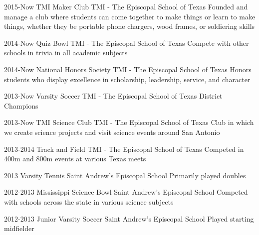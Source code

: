 \documentclass[]{friggeri-cv} %
\begin{document}
\begin{entrylist}


\entry
{2015-Now}
{TMI Maker Club}
{TMI - The Episcopal School of Texas}
{Founded and manage a club where students can come together to make things or learn to make things, whether they be portable phone chargers, wood frames, or soldiering skills}


\entry
{2014-Now}
{Quiz Bowl}
{TMI - The Episcopal School of Texas}
{Compete with other schools in trivia in all academic subjects}


\entry
{2014-Now}
{National Honors Society}
{TMI - The Episcopal School of Texas}
{Honors students who display excellence in scholarship, leadership, service, and character}


\entry
{2013-Now}
{Varsity Soccer}
{TMI - The Episcopal School of Texas}
{District Champions}


\entry
{2013-Now}
{TMI Science Club}
{TMI - The Episcopal School of Texas}
{Club in which we create science projects and visit science events around San Antonio}


\entry
{2013-2014}
{Track and Field}
{TMI - The Episcopal School of Texas}
{Competed in 400m and 800m events at various Texas meets}


\entry
{2013}
{Varsity Tennis}
{Saint Andrew's Episcopal School}
{Primarily played doubles}


\entry
{2012-2013}
{Mississippi Science Bowl}
{Saint Andrew's Episcopal School}
{Competed with schools across the state in various science subjects}


\entry
{2012-2013}
{Junior Varsity Soccer}
{Saint Andrew's Episcopal School}
{Played starting midfielder}


\end{entrylist}
\end{document}
